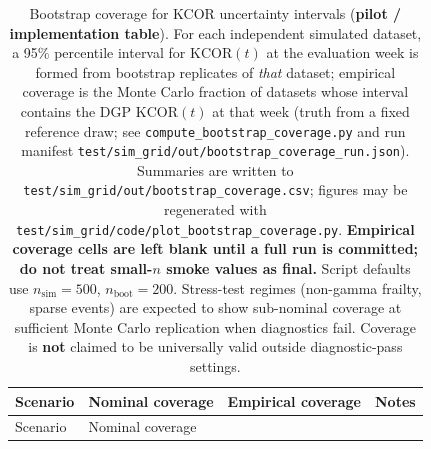 \documentclass[
]{article}
\begin{document}
\begin{longtable}[]{@{}
  >{\raggedright\arraybackslash}p{}
  >{\raggedright\arraybackslash}p{}
  >{\raggedright\arraybackslash}p{}
  >{\raggedright\arraybackslash}p{}@{}}
\caption{Bootstrap coverage for KCOR uncertainty intervals
(\textbf{pilot / implementation table}). For each independent simulated
dataset, a 95\% percentile interval for \(\mathrm{KCOR}(t)\) at the
evaluation week is formed from bootstrap replicates of \emph{that}
dataset; empirical coverage is the Monte Carlo fraction of datasets
whose interval contains the DGP \(\mathrm{KCOR}(t)\) at that week (truth
from a fixed reference draw; see
\protect\texttt{compute\_bootstrap\_coverage.py} and run manifest
\protect\texttt{test/sim\_grid/out/bootstrap\_coverage\_run.json}).
Summaries are written to
\protect\texttt{test/sim\_grid/out/bootstrap\_coverage.csv}; figures may
be regenerated with
\protect\texttt{test/sim\_grid/code/plot\_bootstrap\_coverage.py}.
\textbf{Empirical coverage cells are left blank until a full run is
committed; do not treat small-\(n\) smoke values as final.} Script
defaults use \(n_{\mathrm{sim}}=500\), \(n_{\mathrm{boot}}=200\).
Stress-test regimes (non-gamma frailty, sparse events) are expected to
show sub-nominal coverage at sufficient Monte Carlo replication when
diagnostics fail. Coverage is \textbf{not} claimed to be universally
valid outside diagnostic-pass
settings.}\label{tbl:bootstrap_coverage}\tabularnewline
\toprule\noalign{}
\begin{minipage}[b]{\linewidth}\raggedright
Scenario
\end{minipage} & \begin{minipage}[b]{\linewidth}\raggedright
Nominal coverage
\end{minipage} & \begin{minipage}[b]{\linewidth}\raggedright
Empirical coverage
\end{minipage} & \begin{minipage}[b]{\linewidth}\raggedright
Notes
\end{minipage} \\
\midrule\noalign{}
\endfirsthead
\toprule\noalign{}
\begin{minipage}[b]{\linewidth}\raggedright
Scenario
\end{minipage} & \begin{minipage}[b]{\linewidth}\raggedright
Nominal coverage

\end{minipage}
\end{longtable}
\end{document}

